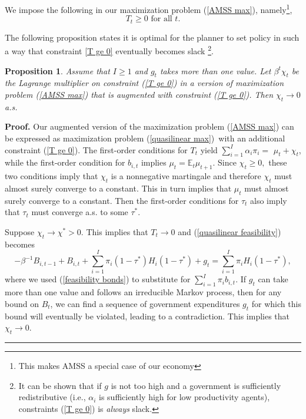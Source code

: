 \documentclass[thmsb,11pt]{article}
\newtheorem{proposition}{Proposition}
\newenvironment{proof}[1][Proof]{\noindent \textbf{#1.} }{\  \rule{0.5em}{0.5em}}
\begin{document}
We impose  the following in our maximization problem (\ref{AMSS max}), namely\footnote{This makes AMSS a special case of our economy },
\begin{equation}
T_{t}\geq 0\text{ for all }t.  \label{T ge 0}
\end{equation}%


The following proposition states it is optimal for the planner to set policy in such a way that constraint \eqref{T ge 0} eventually becomes slack \footnote{It can be shown that if $g$ is not too high and a government is sufficiently redistributive (i.e.,  $\alpha_i$ is sufficiently high for low productivity agents), constraints (\ref{T ge 0}) is \emph{always} slack.}.
\smallskip
\begin{proposition}\label{prop:AMSS_killer1}
Assume that $I \geq 1$ and $g_t$ takes more than one value. Let $\beta ^{t}\chi _{t}$ be the Lagrange multiplier on constraint (\ref{T
ge 0}) in a version of  maximization problem (\ref{AMSS max}) that is augmented with constraint (\ref{T
ge 0}). Then $\chi _{t}\rightarrow
0 $ a.s.
\end{proposition}

\begin{proof}
\smallskip Our augmented version of the maximization problem (\ref{AMSS max}) can be expressed
as maximization problem (\ref{quasilinear max})\ with an additional
constraint (\ref{T ge 0}). The first-order conditions for $T_{t}$ yield $%
\sum_{i=1}^{I}\alpha _{i}\pi _{i}=$ $\mu _{t}+\chi _{t}$, while the
first-order condition for $b_{i,t}$ implies $\mu _{t}=\mathbb{E}%
_{t}\mu _{t+1}.$ Since $\chi _{t}\geq 0,$ these two conditions imply
that $\chi _{t}$ is a nonnegative martingale and therefore $\chi _{t}$ must
almost surely converge to a constant. This in turn implies that $\mu _{t}$ must
almost surely converge to a constant. Then the first-order conditions for $\tau _{t}$
also imply that $\tau _{t}$ must converge a.s. to some $\tau ^{\ast }.$

Suppose $\chi _{t}\rightarrow \chi ^{\ast }>0.$ This implies that $%
T_{t}\rightarrow 0$ and (\ref{quasilinear feasibility}) becomes
\begin{equation*}
-\beta ^{-1}B_{i,t-1}+B_{i,t}+\sum_{i=1}^{I}\pi _{i}\left( 1-\tau ^{\ast
}\right) H_{i}\left( 1-\tau ^{\ast }\right) +g_{t}=\sum_{i=1}^{I}\pi
_{i}H_{i}\left( 1-\tau ^{\ast }\right) ,
\end{equation*}%
where we used (\ref{feasibility bonds}) to substitute for $\sum_{i=1}^{I}\pi
_{i}b_{i,t}.$ If $g_{t}$ can take more than one value and follows an irreducible
Markov process, then for any bound on $B_{t}$, we can find a sequence of
government expenditures $g_{t}$ for which this bound will eventually be
violated, leading to a contradiction. This implies that $\chi
_{t}\rightarrow 0.$
\end{proof}
\end{document}
